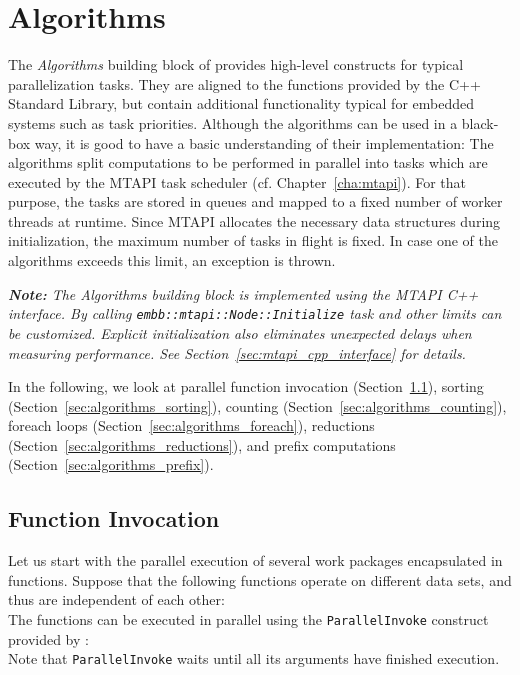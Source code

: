 \chapter{Algorithms}
\label{cha:algorithms}

The \emph{Algorithms} building block of \embb provides high-level constructs for typical parallelization tasks. They are aligned to the functions provided by the C++ Standard Library, but contain additional functionality typical for embedded systems such as task priorities. Although the algorithms can be used in a black-box way, it is good to have a basic understanding of their implementation: The algorithms split computations to be performed in parallel into tasks which are executed by the MTAPI task scheduler (cf. Chapter~\ref{cha:mtapi}). For that purpose, the tasks are stored in queues and mapped to a fixed number of worker threads at runtime. Since MTAPI allocates the necessary data structures during initialization, the maximum number of tasks in flight is fixed. In case one of the algorithms exceeds this limit, an exception is thrown.

\emph{\textbf{Note:} The \emph{Algorithms} building block is implemented using the MTAPI C++ interface. By calling \lstinline|embb::mtapi::Node::Initialize| task and other limits can be customized. Explicit initialization also eliminates unexpected delays when measuring performance. See Section~\ref{sec:mtapi_cpp_interface} for details.}

In the following, we look at parallel function invocation (Section~\ref{sec:algorithms_invoke}), sorting (Section~\ref{sec:algorithms_sorting}), counting (Section~\ref{sec:algorithms_counting}), foreach loops (Section~\ref{sec:algorithms_foreach}), reductions (Section~\ref{sec:algorithms_reductions}), and prefix computations (Section~\ref{sec:algorithms_prefix}).

\section{Function Invocation}
\label{sec:algorithms_invoke}

Let us start with the parallel execution of several work packages encapsulated in functions. Suppose that the following functions operate on different data sets, and thus are independent of each other:
%
\\
%
The functions can be executed in parallel using the \lstinline|ParallelInvoke| construct provided by {\embb}:
%
\\
%
Note that \lstinline|ParallelInvoke| waits until all its arguments have finished execution.

